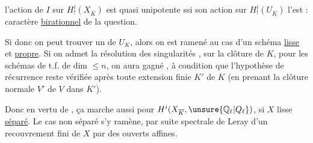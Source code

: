 l'action de $I$ sur $H^i_!(X_{\overline K})$ est quasi unipotente ssi son action sur $H^i_!(U_{\overline K})$ l'est : caractère \uline{birationnel} de la question.

Si donc on peut trouver un    de  $U_K$, alors on est ramené au cas d'un schéma \uline{lisse} et \uline{propre}. Si on admet la résolution des singularités  , sur la clôture   de $K$, pour les schémas de t.f. de dim $\leq n$, on aura gagné , à condition que l'hypothèse de récurrence reste vérifiée après toute extension  finie  $K'$ de $K$ (en prenant la clôture normale $V'$ de $V$ dans $K'$).

 Donc en vertu de  , ça marche aussi pour $H^i(X_{\overline K},\unsure{\mathbb Q_\ell|Q_\ell})$, si $X$ lisse \uline{séparé}. Le cas non séparé s'y ramène, par suite spectrale de Leray d'un recouvrement fini de $X$ par des ouverts affines.


